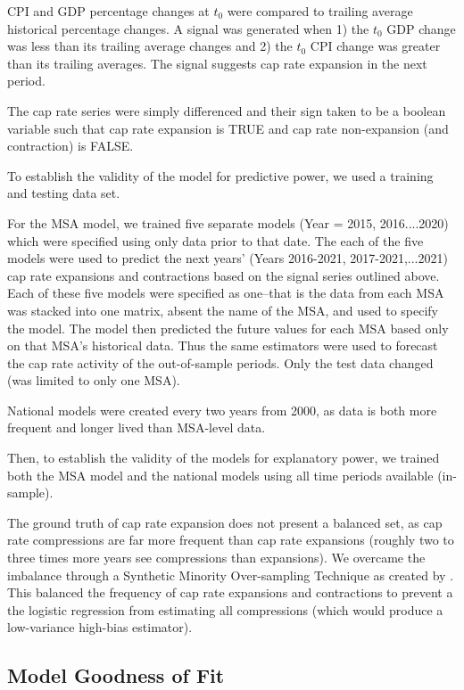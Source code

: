 CPI and GDP percentage changes at $t_0$ were compared to trailing average historical percentage changes. A  signal was generated when 1) the $t_0$ GDP change was less than its trailing average changes and 2) the $t_0$ CPI change was greater than its trailing averages. The signal suggests cap rate expansion in the next period. 

The cap rate series were simply differenced and their sign taken to be a boolean variable such that cap rate expansion is TRUE and cap rate non-expansion (and contraction) is FALSE.

To establish the validity of the model for predictive power, we used a training and testing data set.

For the MSA model, we trained five separate models (Year = 2015, 2016....2020) which were specified using only data prior to that date. The each of the five models were used to predict the next years' (Years 2016-2021, 2017-2021,...2021) cap rate expansions and contractions based on the signal series outlined above. Each of these five models were specified as one--that is the data from each MSA was stacked into one matrix, absent the name of the MSA, and used to specify the model. The model then predicted the future values for each MSA based only on that MSA's historical data. Thus the same estimators were used to forecast the cap rate activity of the out-of-sample periods. Only the test data changed (was limited to only one MSA).

National models were created every two years from 2000, as data is both more frequent and longer lived than MSA-level data. 

Then, to establish the validity of the models for explanatory power, we trained both the MSA model and the national models using all time periods available (in-sample).

The ground truth of cap rate expansion does not present a balanced set, as cap rate compressions are far more frequent than cap rate expansions (roughly two to three times more years see compressions than expansions). We overcame the imbalance through a Synthetic Minority Over-sampling Technique as created by \citep*{SMOTE}. This balanced the frequency of cap rate expansions and contractions to prevent a the logistic regression from estimating all compressions (which would produce a low-variance high-bias estimator).

\subsection{Model Goodness of Fit}


